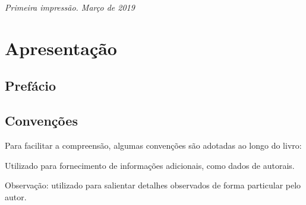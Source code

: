 \documentclass[11pt,fleqn]{book} %
\begin{document}
\vspace{0.5cm}

\noindent \textit{Primeira impressão. Março de 2019} %




\pagestyle{empty} %

\tableofcontents %

\cleardoublepage %

\pagestyle{fancy} %



\chapter*{Apresentação}

\section*{Prefácio}

\lipsum[1-2]

\section*{Convenções}

Para facilitar a compreensão, algumas convenções são adotadas ao longo do livro:

\begin{info}
	Utilizado para fornecimento de informações adicionais, como dados de autorais.
\end{info}

\begin{obs}
	Observação: utilizado para salientar detalhes observados de forma particular pelo autor.
\end{obs}
\end{document}

